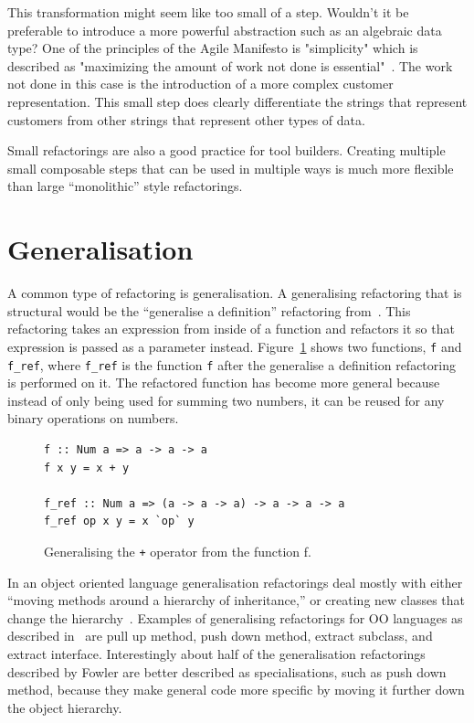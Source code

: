  This transformation might seem like too small of a step. Wouldn't it be preferable to introduce a more powerful abstraction such as an algebraic data type? One of the principles of the Agile Manifesto is "simplicity" which is described as "maximizing the amount of work not done is essential"~\citep{agileManifesto}. The work not done in this case is the introduction of a more complex customer representation. This small step does clearly differentiate the strings that represent customers from other strings that represent other types of data.
 
Small refactorings are also a good practice for tool builders. Creating multiple small composable steps that can be used in multiple ways is much more flexible than large ``monolithic'' style refactorings.


\section{Generalisation}
\label{genMaybe}

A common type of refactoring is generalisation. A generalising refactoring that is structural would be the ``generalise a definition'' refactoring from~\citep{huiqingThesis}. This refactoring takes an expression from inside of a function and refactors it so that expression is passed as a parameter instead. Figure~\ref{genOp} shows two functions, \texttt{f} and \texttt{f\_ref}, where \texttt{f\_ref} is the function \texttt{f} after the generalise a definition refactoring is performed on it. The refactored function has become more general because instead of only being used for summing two numbers, it can be reused for any binary operations on numbers. 

\begin{figure}[t]
\begin{lstlisting}
f :: Num a => a -> a -> a
f x y = x + y

f_ref :: Num a => (a -> a -> a) -> a -> a -> a
f_ref op x y = x `op` y
\end{lstlisting}
\caption{Generalising the \texttt{+} operator from the function f.}
\label{genOp}
\end{figure} 

In an object oriented language generalisation refactorings deal mostly with either ``moving methods around a hierarchy of inheritance,'' or creating new classes that change the hierarchy~\citep{fowler}. Examples of generalising refactorings for OO languages as described in~\citep{fowler} are pull up method, push down method, extract subclass, and extract interface. Interestingly about half of the generalisation refactorings described by Fowler are better described as specialisations, such as push down method, because they make general code more specific by moving it further down the object hierarchy.

